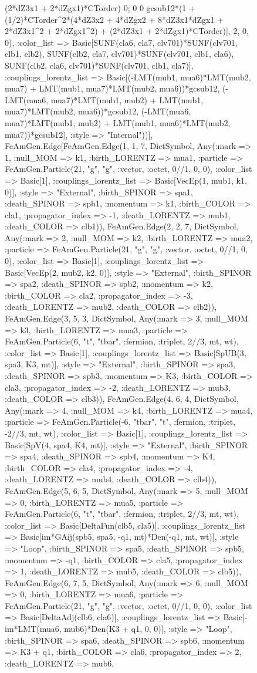 \documentclass{revtex4}
\begin{document}
\begin{figure}[!htb]
\begin{center}
{(2*dZ3x1 + 2*dZgx1)*CTorder) 0; 0 0 gcsub12*(1 + (1/2)*CTorder^2*(4*dZ3x2 + 4*dZgx2 + 8*dZ3x1*dZgx1 + 2*dZ3x1^2 + 2*dZgx1^2) + (2*dZ3x1 + 2*dZgx1)*CTorder)], 2, 0, 0), :color_list => Basic[SUNF(cla6, cla7, clv701)*SUNF(clv701, clb1, clb2), SUNF(clb2, cla7, clv701)*SUNF(clv701, clb1, cla6), SUNF(clb2, cla6, clv701)*SUNF(clv701, clb1, cla7)], :couplings_lorentz_list => Basic[(-LMT(mub1, mua6)*LMT(mub2, mua7) + LMT(mub1, mua7)*LMT(mub2, mua6))*gcsub12, (-LMT(mua6, mua7)*LMT(mub1, mub2) + LMT(mub1, mua7)*LMT(mub2, mua6))*gcsub12, (-LMT(mua6, mua7)*LMT(mub1, mub2) + LMT(mub1, mua6)*LMT(mub2, mua7))*gcsub12], :style => "Internal"))], FeAmGen.Edge[FeAmGen.Edge(1, 1, 7, Dict{Symbol, Any}(:mark => 1, :null_MOM => k1, :birth_LORENTZ => mua1, :particle => FeAmGen.Particle(21, "g", "g", :vector, :octet, 0//1, 0, 0), :color_list => Basic[1], :couplings_lorentz_list => Basic[VecEp(1, mub1, k1, 0)], :style => "External", :birth_SPINOR => spa1, :death_SPINOR => spb1, :momentum => k1, :birth_COLOR => cla1, :propagator_index => -1, :death_LORENTZ => mub1, :death_COLOR => clb1)), FeAmGen.Edge(2, 2, 7, Dict{Symbol, Any}(:mark => 2, :null_MOM => k2, :birth_LORENTZ => mua2, :particle => FeAmGen.Particle(21, "g", "g", :vector, :octet, 0//1, 0, 0), :color_list => Basic[1], :couplings_lorentz_list => Basic[VecEp(2, mub2, k2, 0)], :style => "External", :birth_SPINOR => spa2, :death_SPINOR => spb2, :momentum => k2, :birth_COLOR => cla2, :propagator_index => -3, :death_LORENTZ => mub2, :death_COLOR => clb2)), FeAmGen.Edge(3, 5, 3, Dict{Symbol, Any}(:mark => 3, :null_MOM => k3, :birth_LORENTZ => mua3, :particle => FeAmGen.Particle(6, "t", "tbar", :fermion, :triplet, 2//3, mt, wt), :color_list => Basic[1], :couplings_lorentz_list => Basic[SpUB(3, spa3, K3, mt)], :style => "External", :birth_SPINOR => spa3, :death_SPINOR => spb3, :momentum => K3, :birth_COLOR => cla3, :propagator_index => -2, :death_LORENTZ => mub3, :death_COLOR => clb3)), FeAmGen.Edge(4, 6, 4, Dict{Symbol, Any}(:mark => 4, :null_MOM => k4, :birth_LORENTZ => mua4, :particle => FeAmGen.Particle(-6, "tbar", "t", :fermion, :triplet, -2//3, mt, wt), :color_list => Basic[1], :couplings_lorentz_list => Basic[SpV(4, spa4, K4, mt)], :style => "External", :birth_SPINOR => spa4, :death_SPINOR => spb4, :momentum => K4, :birth_COLOR => cla4, :propagator_index => -4, :death_LORENTZ => mub4, :death_COLOR => clb4)), FeAmGen.Edge(5, 6, 5, Dict{Symbol, Any}(:mark => 5, :null_MOM => 0, :birth_LORENTZ => mua5, :particle => FeAmGen.Particle(6, "t", "tbar", :fermion, :triplet, 2//3, mt, wt), :color_list => Basic[DeltaFun(clb5, cla5)], :couplings_lorentz_list => Basic[im*GAij(spb5, spa5, -q1, mt)*Den(-q1, mt, wt)], :style => "Loop", :birth_SPINOR => spa5, :death_SPINOR => spb5, :momentum => -q1, :birth_COLOR => cla5, :propagator_index => 1, :death_LORENTZ => mub5, :death_COLOR => clb5)), FeAmGen.Edge(6, 7, 5, Dict{Symbol, Any}(:mark => 6, :null_MOM => 0, :birth_LORENTZ => mua6, :particle => FeAmGen.Particle(21, "g", "g", :vector, :octet, 0//1, 0, 0), :color_list => Basic[DeltaAdj(clb6, cla6)], :couplings_lorentz_list => Basic[-im*LMT(mua6, mub6)*Den(K3 + q1, 0, 0)], :style => "Loop", :birth_SPINOR => spa6, :death_SPINOR => spb6, :momentum => K3 + q1, :birth_COLOR => cla6, :propagator_index => 2, :death_LORENTZ => mub6, }
\end{center}
\end{figure}
\end{document}
